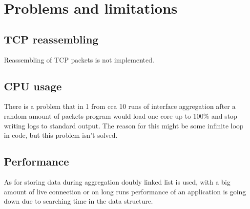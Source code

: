 \documentclass[12pt,a4paper]{article}
\begin{document}
    \section{Problems and limitations}
    \subsection{TCP reassembling}
    Reassembling of TCP packets is not implemented.
    
    \subsection{CPU usage}
    There is a problem that in 1 from cca 10 runs of interface aggregation after a 
    random amount of packets program would load one core up to 100\% and stop 
    writing logs to standard output. The reason for this might be some infinite 
    loop in code, but this problem isn't solved.  

    \subsection{Performance}
    As for storing data during aggregation doubly linked list is used, with a 
    big amount of live connection or on long runs performance of an application 
    is going down due to searching time in the data structure.


    \newpage
    \nocite{*}
    
    
\end{document}
